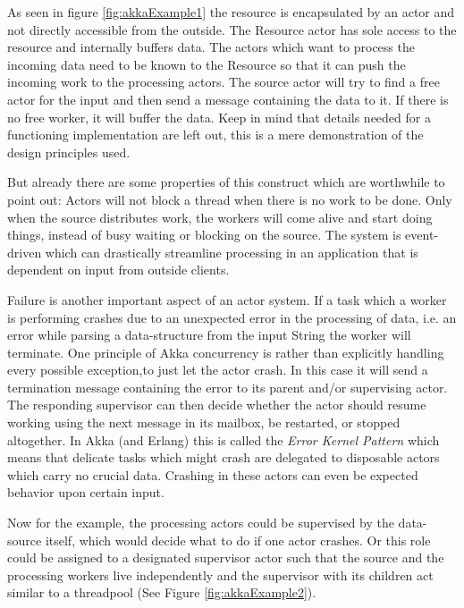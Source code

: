 \documentclass[twoside, 11pt]{scrartcl}
\begin{document}
As seen in figure \ref{fig:akkaExample1} the resource is encapsulated by an actor and not directly accessible from the outside. The Resource actor has sole access to the resource and internally buffers data. The actors which want to process the incoming data need to be known to the Resource so that it can push the incoming work to the processing actors. The source actor will try to find a free actor for the input and then send a message containing the data to it. If there is no free worker, it will buffer the data. Keep in mind that details needed for a functioning implementation are left out, this is a mere demonstration of the design principles used.

But already there are some properties of this construct which are worthwhile to point out: Actors will not block a thread when there is no work to be done. Only when the source distributes work, the workers will come alive and start doing things, instead of busy waiting or blocking on the source. The system is event-driven which can drastically streamline processing in an application that is dependent on input from outside clients.

Failure is another important aspect of an actor system. If a task which a worker is performing crashes due to an unexpected error in the processing of data, i.e. an error while parsing a data-structure from the input String the worker will terminate. One principle of Akka concurrency is rather than explicitly handling every  possible exception,to just let the actor crash. In this case it will send a termination message containing the error to its parent and/or supervising actor. 
The responding supervisor can then decide whether the actor should resume working using the next message in its mailbox, be restarted, or stopped altogether.
In Akka (and Erlang) this is called the \textit{Error Kernel Pattern} which means that delicate tasks which might crash are delegated to disposable actors which carry no crucial data. Crashing in these actors can even be expected behavior upon certain input.

Now for the example, the processing actors could be supervised by the data-source itself, which would decide what to do if one actor crashes. Or this role could be assigned to a designated supervisor actor such that the source and the processing workers live independently and the supervisor with its children act similar to a threadpool (See Figure \ref{fig:akkaExample2}).
\end{document}

